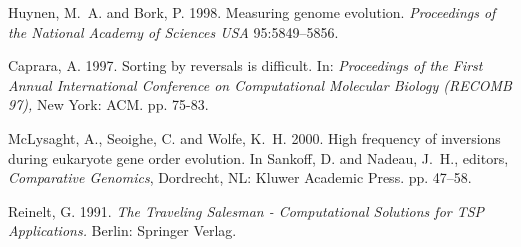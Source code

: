 \documentclass[twoside]{article}
\begin{document}
\footnotesize 
 \begin{thebibliography}{99}
 
 Huynen, M.~A. and Bork, P. 1998. Measuring genome evolution. {\em
Proceedings of the National Academy of Sciences USA}
  95:5849--5856.

 Caprara, A. 1997. Sorting by reversals is difficult. In: {\em
Proceedings of the First Annual International Conference on Computational
Molecular Biology (RECOMB 97),} New York: ACM.  pp. 75-83.

McLysaght, A., Seoighe, C. and Wolfe, K.~H. 2000. High frequency
of inversions during eukaryote gene order evolution.     In Sankoff, D. and
Nadeau, J.~H., editors, {\em Comparative Genomics},  Dordrecht, NL: Kluwer
Academic Press. pp. 47--58.

 Reinelt, G. 1991. {\em The Traveling Salesman - Computational
Solutions for TSP Applications.} Berlin: Springer Verlag. 
 
\end{thebibliography}
\end{document}
